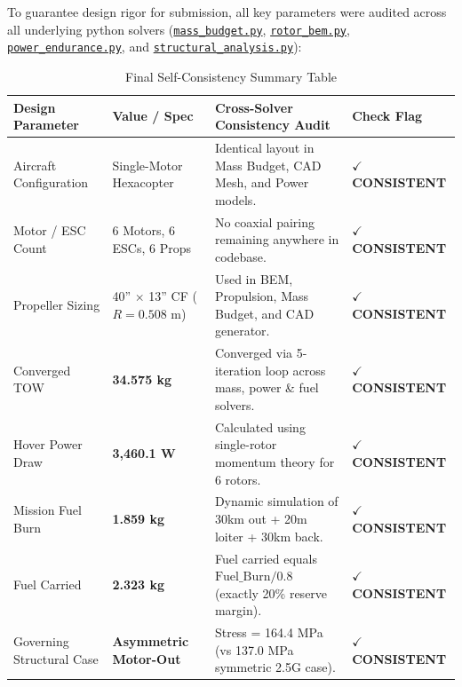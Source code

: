 \documentclass[11pt,a4paper]{article}
\begin{document}
To guarantee design rigor for submission, all key parameters were audited across all underlying python solvers (\href{https://github.com/Bishu-crypto/quadcopter-autonomy/blob/main/projects/heavy-lift-uav/design_calculations/mass_budget.py}{\texttt{mass\_budget.py}}, \href{https://github.com/Bishu-crypto/quadcopter-autonomy/blob/main/projects/heavy-lift-uav/simulation/rotor_bem.py}{\texttt{rotor\_bem.py}}, \href{https://github.com/Bishu-crypto/quadcopter-autonomy/blob/main/projects/heavy-lift-uav/design_calculations/power_endurance.py}{\texttt{power\_endurance.py}}, and \href{https://github.com/Bishu-crypto/quadcopter-autonomy/blob/main/projects/heavy-lift-uav/design_calculations/structural_analysis.py}{\texttt{structural\_analysis.py}}):

\begin{table}[H]
    \centering
    \caption{Final Self-Consistency Summary Table}
    \begin{tabular}{llp{6.5cm}l}
        \toprule
        \textbf{Design Parameter} & \textbf{Value / Spec} & \textbf{Cross-Solver Consistency Audit} & \textbf{Check Flag} \\
        \midrule
        Aircraft Configuration & Single-Motor Hexacopter & Identical layout in Mass Budget, CAD Mesh, and Power models. & \textbf{$\checkmark$ CONSISTENT} \\
        Motor / ESC Count & 6 Motors, 6 ESCs, 6 Props & No coaxial pairing remaining anywhere in codebase. & \textbf{$\checkmark$ CONSISTENT} \\
        Propeller Sizing & 40'' $\times$ 13'' CF ($R = 0.508$ m) & Used in BEM, Propulsion, Mass Budget, and CAD generator. & \textbf{$\checkmark$ CONSISTENT} \\
        Converged TOW & \textbf{34.575 kg} & Converged via 5-iteration loop across mass, power \& fuel solvers. & \textbf{$\checkmark$ CONSISTENT} \\
        Hover Power Draw & \textbf{3,460.1 W} & Calculated using single-rotor momentum theory for 6 rotors. & \textbf{$\checkmark$ CONSISTENT} \\
        Mission Fuel Burn & \textbf{1.859 kg} & Dynamic simulation of 30km out + 20m loiter + 30km back. & \textbf{$\checkmark$ CONSISTENT} \\
        Fuel Carried & \textbf{2.323 kg} & Fuel carried equals $\text{Fuel\_Burn} / 0.8$ (exactly 20\% reserve margin). & \textbf{$\checkmark$ CONSISTENT} \\
        Governing Structural Case & \textbf{Asymmetric Motor-Out} & Stress = 164.4 MPa (vs 137.0 MPa symmetric 2.5G case). & \textbf{$\checkmark$ CONSISTENT} \\

\end{tabular}
\end{table}
\end{document}
